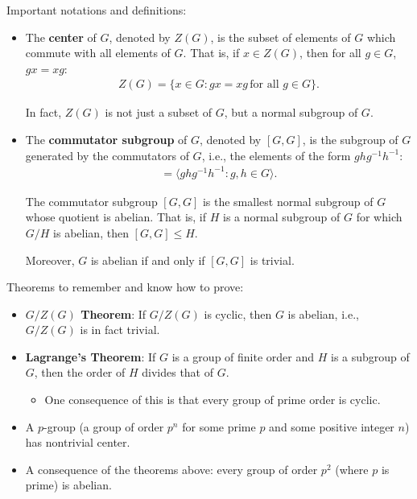 \begin{concept}

\envlist

Important notations and definitions:

\begin{itemize}
\item
  The \textbf{center} of \(G\), denoted by \(Z(G)\), is the subset of
  elements of \(G\) which commute with all elements of \(G\). That is,
  if \(x \in Z(G)\), then for all \(g \in G\), \(gx = xg\):
  \begin{align*}Z(G) = \{ x \in G : gx = xg \, \text{for all } g \in G \}.\end{align*}

  In fact, \(Z(G)\) is not just a subset of \(G\), but a normal subgroup
  of \(G\).
\item
  The \textbf{commutator subgroup} of \(G\), denoted by \([G, G]\), is
  the subgroup of \(G\) generated by the commutators of \(G\), i.e., the
  elements of the form \(ghg^{-1}h^{-1}\):
  \begin{align*}[G, G] = \langle ghg^{-1}h^{-1} : g, h \in G \rangle.\end{align*}

  The commutator subgroup \([G,G]\) is the smallest normal subgroup of
  \(G\) whose quotient is abelian. That is, if \(H\) is a normal
  subgroup of \(G\) for which \(G/H\) is abelian, then \([G, G] \le H\).

  Moreover, \(G\) is abelian if and only if \([G,G]\) is trivial.
\end{itemize}

Theorems to remember and know how to prove:

\begin{itemize}
\item
  \textbf{\(G/Z(G)\) Theorem}: If \(G/Z(G)\) is cyclic, then \(G\) is
  abelian, i.e., \(G/Z(G)\) is in fact trivial.
\item
  \textbf{Lagrange's Theorem}: If \(G\) is a group of finite order and
  \(H\) is a subgroup of \(G\), then the order of \(H\) divides that of
  \(G\).

  \begin{itemize}
  \tightlist
  \item
    One consequence of this is that every group of prime order is
    cyclic.
  \end{itemize}
\item
  A \(p\)-group (a group of order \(p^n\) for some prime \(p\) and some
  positive integer \(n\)) has nontrivial center.
\item
  A consequence of the theorems above: every group of order \(p^2\)
  (where \(p\) is prime) is abelian.
\end{itemize}

\end{concept}

